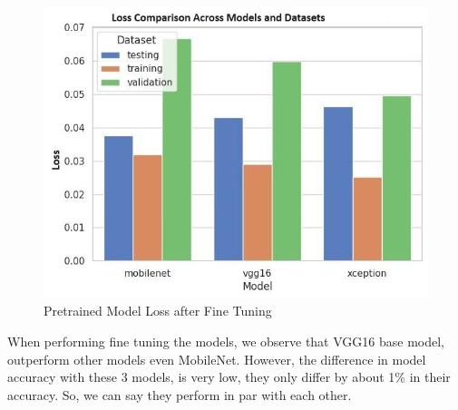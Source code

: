 \begin{figure}
    \centering
    \includegraphics[width=0.75\linewidth]{graphics//chapter6/model loss after fine tuning.png}
    \caption{Pretrained Model Loss after Fine Tuning}
    \label{fig:loss-ft}
\end{figure}

When performing fine tuning the models, we observe that  VGG16 base model, outperform  other models even MobileNet. However, the difference in model accuracy with these 3 models, is very low, they only differ by about 1\% in their accuracy. So, we can say they perform in par with each other.\par\vspace{1em}


